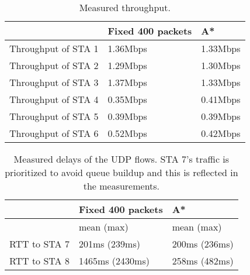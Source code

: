 \documentclass[10pt,twocolumn, journal]{IEEEtran}
\begin{document}
\begin{table}[tb]
    \begin{center}
        {\footnotesize
            \begin{tabular}{|l|l|l|}
            \hline
                                    & \textbf{Fixed 400 packets} & \textbf{A*}  \\
            \hline
            Throughput of STA 1     & 1.36Mbps                  & 1.33Mbps  \\
            \hline
            Throughput of STA 2     & 1.29Mbps                  & 1.30Mbps  \\
            \hline
            Throughput of STA 3     & 1.37Mbps                  & 1.33Mbps  \\
            \hline
            Throughput of STA 4     & 0.35Mbps                  & 0.41Mbps  \\
            \hline
            Throughput of STA 5     & 0.39Mbps                  & 0.39Mbps  \\
            \hline
            Throughput of STA 6     & 0.52Mbps                  & 0.42Mbps  \\
            \hline
            \end{tabular}
        }
    \end{center}
    \caption{Measured throughput.} \label{tab_cubic}
\end{table}

\begin{table}[tb]
\centering
    \begin{footnotesize}
            \begin{tabular}{|l|l|l|}
            \hline
                           & \textbf{Fixed 400 packets}    & \textbf{A*}  \\
            \hline
                           & mean (max)                 & mean (max)   \\
            \hline
            RTT to STA 7   & 201ms (239ms)              & 200ms (236ms)  \\
            \hline
            RTT to STA 8   & 1465ms  (2430ms)           & 258ms  (482ms) \\
            \hline
            \end{tabular}
            \caption{Measured delays of the UDP flows. STA 7's traffic is prioritized to avoid queue buildup and this is reflected in the measurements.}
            \label{tab_delay}
    \end{footnotesize}


\end{table}
\end{document}
